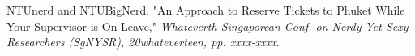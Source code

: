 \begin{thebibliography}{1}

\bibitem{} NTUnerd and NTUBigNerd, "An Approach to Reserve Tickets to Phuket While Your Supervisor is On Leave," \emph{Whateverth Singaporean Conf. on Nerdy Yet Sexy Researchers (SgNYSR), 20whateverteen, pp. xxxx-xxxx}.

\end{thebibliography}